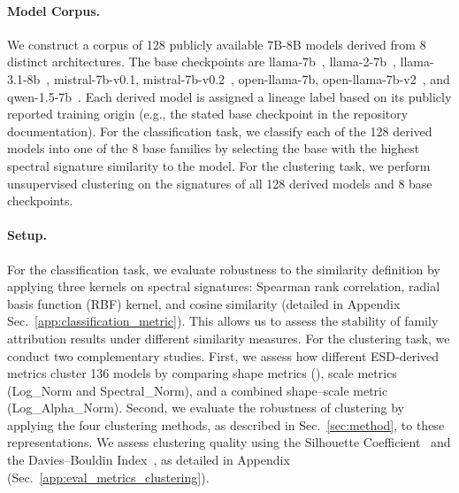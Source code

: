 \paragraph{Model Corpus.}
We construct a corpus of 128 publicly available 7B-8B models derived from 8 distinct architectures. The base checkpoints are llama-7b~\cite{touvron2023llamaopenefficientfoundation}, llama-2-7b~\cite{touvron2023llama2openfoundation}, llama-3.1-8b~\cite{grattafiori2024llama3herdmodels}, mistral-7b-v0.1, mistral-7b-v0.2~\cite{jiang2023mistral7b}, open-llama-7b, open-llama-7b-v2~\cite{openlm2023openllama}, and qwen-1.5-7b~\cite{bai2023qwentechnicalreport}. 
Each derived model is assigned a lineage label based on its publicly reported training origin (e.g., the stated base checkpoint in the repository documentation). For the classification task, we classify each of the 128 derived models into one of the 8 base families by selecting the base with the highest spectral signature similarity to the model. For the clustering task, we perform unsupervised clustering on the signatures of all 128 derived models and 8 base checkpoints.


\paragraph{Setup.}
For the classification task, we evaluate robustness to the similarity definition by applying three kernels on spectral signatures: Spearman rank correlation, radial basis function (RBF) kernel, and cosine similarity (detailed in Appendix Sec.~\ref{app:classification_metric}). This allows us to assess the stability of family attribution results under different similarity measures.
For the clustering task, we conduct two complementary studies. First, we assess how different ESD-derived metrics cluster 136 models by comparing shape metrics (\ALPHAHILL), scale metrics (Log\_Norm and Spectral\_Norm), and a combined shape–scale metric (Log\_Alpha\_Norm). Second, we evaluate the robustness of clustering by applying the four clustering methods, as described in Sec.~\ref{sec:method}, to these representations. We assess clustering quality using the Silhouette Coefficient~\cite{rousseeuw1987silhouettes} and the Davies–Bouldin Index~\cite{davies2009cluster}, as detailed in Appendix (Sec.~\ref{app:eval_metrics_clustering}).




